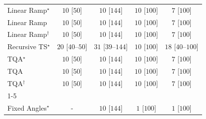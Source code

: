 \begin{tabular}{l|cccc|}
Linear Ramp$^\star$ & {\cellcolor[HTML]{F6FCF4}} \color[HTML]{000000} $10$ [$50$] & {\cellcolor[HTML]{F6FCF4}} \color[HTML]{000000} $10$ [$144$] & {\cellcolor[HTML]{F6FCF4}} \color[HTML]{000000} $10$ [$100$] & {\cellcolor[HTML]{F6FCF4}} \color[HTML]{000000} $7$ [$100$] \\
Linear Ramp & {\cellcolor[HTML]{F6FCF4}} \color[HTML]{000000} $10$ [$50$] & {\cellcolor[HTML]{F6FCF4}} \color[HTML]{000000} $10$ [$144$] & {\cellcolor[HTML]{F6FCF4}} \color[HTML]{000000} $10$ [$100$] & {\cellcolor[HTML]{F6FCF4}} \color[HTML]{000000} $7$ [$100$] \\
Linear Ramp$^\dagger$ & {\cellcolor[HTML]{F6FCF4}} \color[HTML]{000000} $10$ [$50$] & {\cellcolor[HTML]{F6FCF4}} \color[HTML]{000000} $10$ [$144$] & {\cellcolor[HTML]{F6FCF4}} \color[HTML]{000000} $10$ [$100$] & {\cellcolor[HTML]{F6FCF4}} \color[HTML]{000000} $7$ [$100$] \\
Recursive TS$^\star$ & {\cellcolor[HTML]{F4FBF1}} \color[HTML]{000000} $20$ [$40$--$50$] & {\cellcolor[HTML]{F2FAEF}} \color[HTML]{000000} $31$ [$39$--$144$] & {\cellcolor[HTML]{F6FCF4}} \color[HTML]{000000} $10$ [$100$] & {\cellcolor[HTML]{F4FBF2}} \color[HTML]{000000} $18$ [$40$--$100$] \\
TQA$^\star$ & {\cellcolor[HTML]{F6FCF4}} \color[HTML]{000000} $10$ [$50$] & {\cellcolor[HTML]{F6FCF4}} \color[HTML]{000000} $10$ [$144$] & {\cellcolor[HTML]{F6FCF4}} \color[HTML]{000000} $10$ [$100$] & {\cellcolor[HTML]{F6FCF4}} \color[HTML]{000000} $7$ [$100$] \\
TQA & {\cellcolor[HTML]{F6FCF4}} \color[HTML]{000000} $10$ [$50$] & {\cellcolor[HTML]{F6FCF4}} \color[HTML]{000000} $10$ [$144$] & {\cellcolor[HTML]{F6FCF4}} \color[HTML]{000000} $10$ [$100$] & {\cellcolor[HTML]{F6FCF4}} \color[HTML]{000000} $7$ [$100$] \\
TQA$^\dagger$ & {\cellcolor[HTML]{F6FCF4}} \color[HTML]{000000} $10$ [$50$] & {\cellcolor[HTML]{F6FCF4}} \color[HTML]{000000} $10$ [$144$] & {\cellcolor[HTML]{F6FCF4}} \color[HTML]{000000} $10$ [$100$] & {\cellcolor[HTML]{F6FCF4}} \color[HTML]{000000} $7$ [$100$] \\
\cline{1-5}
\multicolumn{5}{c}{\rule{0pt}{8pt}PP} \\
\midrule
Fixed Angles$^\star$ & {\cellcolor[HTML]{000000}} \color[HTML]{F1F1F1} {\cellcolor{white}} \color{black} - & {\cellcolor[HTML]{F6FCF4}} \color[HTML]{000000} $10$ [$144$] & {\cellcolor[HTML]{F7FCF5}} \color[HTML]{000000} $1$ [$100$] & {\cellcolor[HTML]{F7FCF5}} \color[HTML]{000000} $1$ [$100$] \\

\end{tabular}
